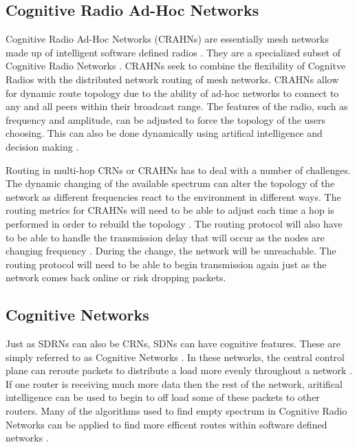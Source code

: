 \subsection{Cognitive Radio Ad-Hoc Networks}

Cognitive Radio Ad-Hoc Networks (CRAHNs) are essentially mesh networks made up of intelligent software defined radios \cite{Akyildiz2009810}. They are a specialized subset of Cognitive Radio Networks \cite{5639025}. CRAHNs seek to combine the flexibility of Cognitve Radios with the distributed network routing of mesh networks. CRAHNs allow for dynamic route topology due to the ability of ad-hoc networks to connect to any and all peers within their broadcast range. The features of the radio, such as frequency and amplitude, can be adjusted to force the topology of the users choosing. This can also be done dynamically using artifical intelligence and decision making \cite{Akyildiz2009810}. 

Routing in multi-hop CRNs or CRAHNs has to deal with a number of challenges. The dynamic changing of the available spectrum can alter the topology of the network as different frequencies react to the environment in different ways. The routing metrics for CRAHNs will need to be able to adjust each time a hop is performed in order to rebuild the topology \cite{6599059}. The routing protocol will also have to be able to handle the transmission delay that will occur as the nodes are changing frequency \cite{6599059}. During the change, the network will be unreachable. The routing protocol will need to be able to begin transmission again just as the network comes back online or risk dropping packets. 

\subsection{Cognitive Networks}

Just as SDRNs can also be CRNs, SDNs can have cognitive features. These are simply referred to as Cognitive Networks \cite{7207253}. In these networks, the central control plane can reroute packets to distribute a load more evenly throughout a network \cite{6982928}. If one router is receiving much more data then the rest of the network, aritifical intelligence can be used to begin to off load some of these packets to other routers. Many of the algorithms used to find empty spectrum in Cognitive Radio Networks can be applied to find more efficent routes within software defined networks \cite{7207253} \cite{6982928}. 




